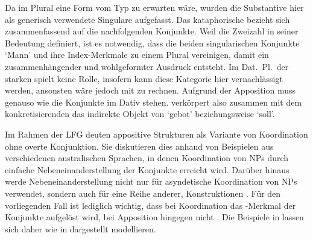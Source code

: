 Da im Plural eine Form vom Typ  zu erwarten wäre, wurden die
Substantive hier als generisch verwendete
Singulare aufgefasst. Das kataphorische
 bezieht sich zusammenfassend auf die nachfolgenden Konjunkte. Weil
 die Zweizahl in seiner Bedeutung definiert, ist es notwendig, dass
die beiden singularischen Konjunkte  `Mann' und  ihre
Index-Merkmale zu einem Plural vereinigen, damit ein zusammenhängender
und wohlgeformter Ausdruck entsteht. Im Dat.~Pl.\ der starken
 spielt  keine Rolle, insofern kann diese
Kategorie hier vernachlässigt werden, ansonsten wäre jedoch mit  zu rechnen. Aufgrund der Apposition muss
 genauso wie die Konjunkte im Dativ stehen.  verkörpert
also zusammen mit dem konkretisierenden  das indirekte
Objekt von  `gebot' beziehungsweise  `soll'.

Im Rahmen der LFG deuten
\citet{sadlernordlinger2006} appositive Strukturen als Variante
von Koordination ohne overte Konjunktion. Sie diskutieren dies anhand von
Beispielen aus verschiedenen australischen Sprachen, in denen Koordination von
NPs durch einfache Nebeneinanderstellung der Konjunkte erreicht wird. Darüber
hinaus werde Nebeneinanderstellung nicht nur für asyndetische Koordination von
NPs verwendet, sondern auch für eine Reihe anderer, 
Konstruktionen \autocite[440--441]{sadlernordlinger2006}. Für
den vorliegenden Fall ist lediglich wichtig, dass bei Koordination das
-Merkmal der Konjunkte aufgelöst wird, bei Apposition hingegen nicht
\autocite[444]{sadlernordlinger2006}. Die Beispiele in
 lassen sich daher wie in
 dargestellt modellieren.

